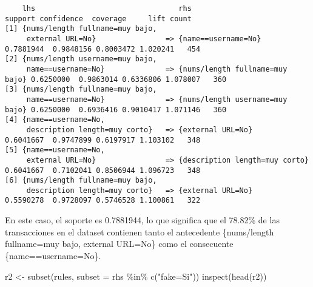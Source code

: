 \documentclass[
  letterpaper,
  DIV=11,
  numbers=noendperiod]{scrreprt}
\newenvironment{Shaded}{\begin{snugshade}}{\end{snugshade}}
\newcommand{\AttributeTok}[1]{\textcolor[rgb]{0.40,0.45,0.13}{#1}}
\newcommand{\FunctionTok}[1]{\textcolor[rgb]{0.28,0.35,0.67}{#1}}
\newcommand{\NormalTok}[1]{\textcolor[rgb]{0.00,0.23,0.31}{#1}}
\newcommand{\OtherTok}[1]{\textcolor[rgb]{0.00,0.23,0.31}{#1}}
\newcommand{\SpecialCharTok}[1]{\textcolor[rgb]{0.37,0.37,0.37}{#1}}
\newcommand{\StringTok}[1]{\textcolor[rgb]{0.13,0.47,0.30}{#1}}
\begin{document}
\begin{verbatim}
    lhs                                 rhs                               support confidence  coverage     lift count
[1] {nums/length fullname=muy bajo,                                                                                  
     external URL=No}                => {name==username=No}             0.7881944  0.9848156 0.8003472 1.020241   454
[2] {nums/length username=muy bajo,                                                                                  
     name==username=No}              => {nums/length fullname=muy bajo} 0.6250000  0.9863014 0.6336806 1.078007   360
[3] {nums/length fullname=muy bajo,                                                                                  
     name==username=No}              => {nums/length username=muy bajo} 0.6250000  0.6936416 0.9010417 1.071146   360
[4] {name==username=No,                                                                                              
     description length=muy corto}   => {external URL=No}               0.6041667  0.9747899 0.6197917 1.103102   348
[5] {name==username=No,                                                                                              
     external URL=No}                => {description length=muy corto}  0.6041667  0.7102041 0.8506944 1.096723   348
[6] {nums/length fullname=muy bajo,                                                                                  
     description length=muy corto}   => {external URL=No}               0.5590278  0.9728097 0.5746528 1.100861   322
\end{verbatim}

En este caso, el soporte es 0.7881944, lo que significa que el 78.82\%
de las transacciones en el dataset contienen tanto el antecedente
\{nums/length fullname=muy bajo, external URL=No\} como el consecuente
\{name==username=No\}.

\begin{Shaded}
\begin{Highlighting}[]
\NormalTok{r2 }\OtherTok{\textless{}{-}} \FunctionTok{subset}\NormalTok{(rules, }\AttributeTok{subset =}\NormalTok{ rhs }\SpecialCharTok{\%in\%} \FunctionTok{c}\NormalTok{(}\StringTok{"fake=Si"}\NormalTok{))}
\FunctionTok{inspect}\NormalTok{(}\FunctionTok{head}\NormalTok{(r2))}
\end{Highlighting}
\end{Shaded}
\end{document}
